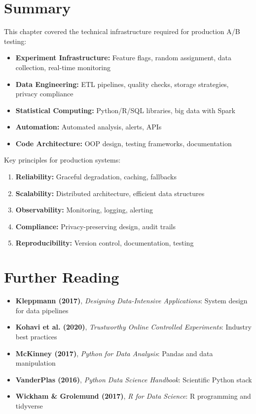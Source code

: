 \section{Summary}

This chapter covered the technical infrastructure required for production A/B testing:

\begin{itemize}
    \item \textbf{Experiment Infrastructure:} Feature flags, random assignment, data collection, real-time monitoring
    \item \textbf{Data Engineering:} ETL pipelines, quality checks, storage strategies, privacy compliance
    \item \textbf{Statistical Computing:} Python/R/SQL libraries, big data with Spark
    \item \textbf{Automation:} Automated analysis, alerts, APIs
    \item \textbf{Code Architecture:} OOP design, testing frameworks, documentation
\end{itemize}

Key principles for production systems:
\begin{enumerate}
    \item \textbf{Reliability:} Graceful degradation, caching, fallbacks
    \item \textbf{Scalability:} Distributed architecture, efficient data structures
    \item \textbf{Observability:} Monitoring, logging, alerting
    \item \textbf{Compliance:} Privacy-preserving design, audit trails
    \item \textbf{Reproducibility:} Version control, documentation, testing
\end{enumerate}

\section{Further Reading}

\begin{itemize}
    \item \textbf{Kleppmann (2017)}, \textit{Designing Data-Intensive Applications}: System design for data pipelines
    \item \textbf{Kohavi et al. (2020)}, \textit{Trustworthy Online Controlled Experiments}: Industry best practices
    \item \textbf{McKinney (2017)}, \textit{Python for Data Analysis}: Pandas and data manipulation
    \item \textbf{VanderPlas (2016)}, \textit{Python Data Science Handbook}: Scientific Python stack
    \item \textbf{Wickham \& Grolemund (2017)}, \textit{R for Data Science}: R programming and tidyverse
\end{itemize}

